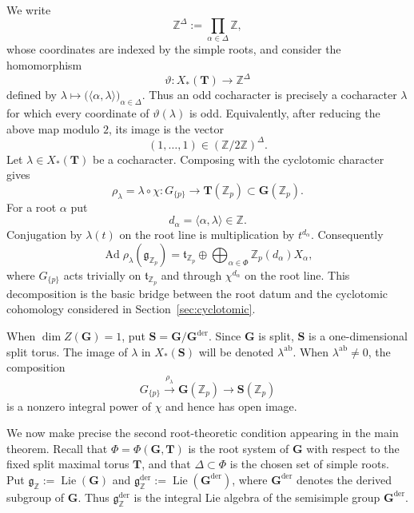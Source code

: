 \documentclass[11pt]{amsart}
\numberwithin{equation}{section}
\newcommand{\Z}{\mathbb Z}
\newcommand{\Zp}{\mathbb Z_p}
\newcommand{\Ad}{\operatorname{Ad}}
\newcommand{\frakg}{\mathfrak g}
\newcommand{\frakt}{\mathfrak t}
\newcommand{\GG}{\mathbf G}
\newcommand{\TT}{\mathbf T}
\newcommand{\Gder}{\mathbf G^{\mathrm{der}}}
\newcommand{\Lie}{\operatorname{Lie}}
\theoremstyle{definition}
\begin{document}
\par We write
\[
        \Z^\Delta
        :=
        \prod_{\alpha\in\Delta}\Z,
\]
whose coordinates are indexed by the simple roots, and consider the
homomorphism
\[
        \vartheta:X_*(\TT)\longrightarrow\Z^\Delta
\]
defined by $\lambda\longmapsto
        \bigl(\langle\alpha,\lambda\rangle\bigr)_{\alpha\in\Delta}$. Thus an odd cocharacter is precisely a cocharacter $\lambda$ for which
every coordinate of $\vartheta(\lambda)$ is odd. Equivalently, after
reducing the above map modulo $2$, its image is the vector
\[
        (1,\ldots,1)\in(\Z/2\Z)^\Delta.
\]
Let $\lambda\in X_*(\TT)$ be a cocharacter. Composing with the
cyclotomic character gives
\begin{equation}\label{eq:toral-general}
        \rho_\lambda=\lambda\circ\chi:
        G_{\{p\}}\longrightarrow\TT(\Zp)\subset\GG(\Zp).
\end{equation}
For a root $\alpha$ put
\[
        d_\alpha=\langle\alpha,\lambda\rangle\in\Z.
\]
Conjugation by $\lambda(t)$ on the root line is multiplication by
$t^{d_\alpha}$. Consequently
\begin{equation}\label{eq:Ad-toral-decomposition}
 \Ad\rho_\lambda(\frakg_{\Zp})
 =
 \frakt_{\Zp}
 \oplus
 \bigoplus_{\alpha\in\Phi}\Zp(d_\alpha)X_\alpha,
\end{equation}
where $G_{\{p\}}$ acts trivially on $\frakt_{\Zp}$ and through
$\chi^{d_\alpha}$ on the root line.  This decomposition is the basic
bridge between the root datum and the cyclotomic cohomology considered
in Section~\ref{sec:cyclotomic}.

When $\dim Z(\GG)=1$, put
$\mathbf S=\GG/\Gder$. Since $\GG$ is split, $\mathbf S$ is a
one-dimensional split torus. The image of $\lambda$ in
$X_*(\mathbf S)$ will be denoted $\lambda^{\mathrm{ab}}$. When $\lambda^{\mathrm{ab}}\neq0$, the composition
\[
 G_{\{p\}}\xrightarrow{\rho_\lambda}\GG(\Zp)
 \longrightarrow\mathbf S(\Zp)
\]
is a nonzero integral power of $\chi$ and hence has open image.

\par We now make precise the second root-theoretic condition appearing in
the main theorem. Recall that $\Phi=\Phi(\GG,\TT)$ is the root system of
$\GG$ with respect to the fixed split maximal torus $\TT$, and that
$\Delta\subset\Phi$ is the chosen set of simple roots. Put $\frakg_{\Z}:=\Lie(\GG)$ and $\frakg_{\Z}^{\mathrm{der}}
        :=\Lie(\Gder)$, where $\Gder$ denotes the derived subgroup of $\GG$. Thus
$\frakg_{\Z}^{\mathrm{der}}$ is the integral Lie algebra of the
semisimple group $\Gder$.
\end{document}
